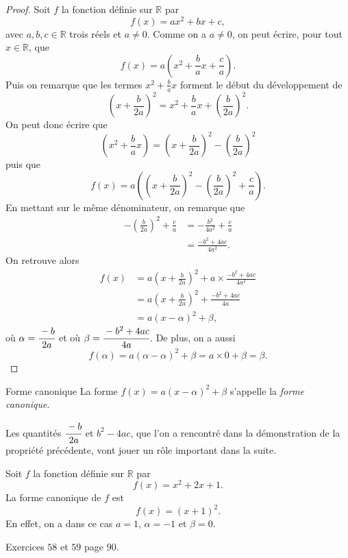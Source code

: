 \documentclass[11pt]{article}
\begin{document}
\begin{proof}
  Soit $f$ la fonction définie sur $\mathbb{R}$ par
  \[
    f(x) = ax^2+bx+c,
  \]
  avec $a,b,c\in\mathbb{R}$ trois réels et $a\neq0$. Comme on a $a\neq0$, on
  peut écrire, pour tout $x\in\mathbb{R}$, que
  \[
    f(x) = a\left( x^2+\frac{b}{a}x+\frac{c}{a} \right).
  \]
  Puis on remarque que les termes $x^2+\frac{b}{a}x$ forment le début du
  développement de
  \[
    \left(x+\frac{b}{2a}\right)^2 = x^2 +
    \frac{b}{a}x+\left(\frac{b}{2a}\right)^2.
  \]
  On peut donc écrire que
  \[
    \left( x^2+\frac{b}{a}x \right) = \left( x+\frac{b}{2a} \right)^2-\left(
    \frac{b}{2a} \right)^2
  \]
  puis que
  \[
    f(x) = a\left( \left( x+\frac{b}{2a} \right)^2-\left( \frac{b}{2a}
    \right)^2+\frac{c}{a} \right).
  \]
  En mettant sur le même dénominateur, on remarque que
  \begin{align*}
    -\left( \frac{b}{2a} \right)^2+\frac{c}{a} &= -\frac{b^2}{4a^2} +
    \frac{c}{a} \\
    &= \frac{-b^2+4ac}{4a^2}.
 \end{align*}
 On retrouve alors
 \begin{align*}
   f(x) &= a\left( x+\frac{b}{2a} \right)^2+a\times\frac{-b^2+4ac}{4a^2} \\
   &= a\left( x+\frac{b}{2a} \right)^2+\frac{-b^2+4ac}{4a} \\
   &= a\left( x-\alpha \right)^2+\beta,
 \end{align*}
 où $\alpha=\cfrac{-b}{2a}$ et où $\beta=\cfrac{-b^2+4ac}{4a}$. De plus, on a
 aussi 
 \[
   f(\alpha) = a\left( \alpha-\alpha \right)^2+\beta= a\times 0+\beta=\beta.
 \]
\end{proof}

\begin{defi}{Forme canonique}
  La forme $f(x) = a(x-\alpha)^2+\beta$ s'appelle la \emph{forme canonique}.
\end{defi}

\begin{rmq}
  Les quantités $\cfrac{-b}{2a}$ et $b^2-4ac$, que l'on a rencontré dans la
  démonstration de la propriété précédente, vont jouer un rôle important dans
  la suite.
\end{rmq}

\begin{exemple}
  Soit $f$ la fonction définie sur $\mathbb{R}$ par
  \[
    f(x) = x^2 + 2x + 1.
  \]
  La forme canonique de $f$ est 
  \[
    f(x) = (x+1)^2.
  \]
  En effet, on a dans ce cas $a=1$, $\alpha=-1$ et $\beta=0$.
\end{exemple}
\begin{exo}
  Exercices $58$ et $59$ page $90$.
\end{exo}
\end{document}
